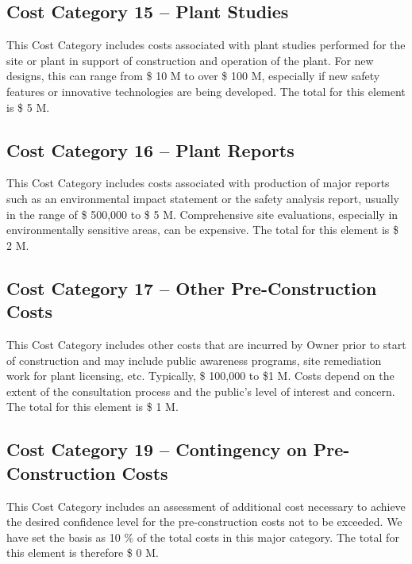 \subsection*{Cost Category 15 – Plant Studies} 
This Cost Category includes costs associated with plant studies performed for the site or plant in support of construction and operation of the plant. For new designs, this can range from \$ 10 M to over \$ 100 M, especially if new safety features or innovative technologies are being developed.  The total for this element is \$ 5 M.

\subsection*{Cost Category 16 – Plant Reports} 
This Cost Category includes costs associated with production of major reports such as an environmental impact statement or the safety analysis report, usually in the range of \$ 500,000 to \$ 5 M. Comprehensive site evaluations, especially in environmentally sensitive areas, can be expensive. The total for this element is \$ 2 M.

\subsection*{Cost Category 17 – Other Pre-Construction Costs} 
This Cost Category includes other costs that are incurred by Owner prior to start of construction and may include public awareness programs, site remediation work for plant licensing, etc. Typically, \$ 100,000 to \$1 M. Costs depend on the extent of the consultation process and the public's level of interest and concern.  The total for this element is \$ 1 M.

\subsection*{Cost Category 19 – Contingency on Pre-Construction Costs}  
This Cost Category includes an assessment of additional cost necessary to achieve the desired confidence level for the pre-construction costs not
to be exceeded. We have set the basis as 10 \% of the total costs in this major category. The total for this element is therefore \$ 0 M.




